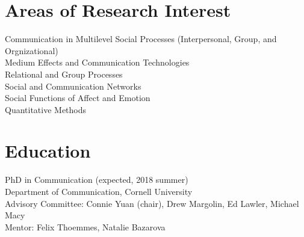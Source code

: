 \documentclass[11pt, letterpaper]{article} %
\newcommand{\years}[1]{\leavevmode\marginnote{\scriptsize #1}} %
\begin{document}

\section*{Areas of Research Interest}

Communication in Multilevel Social Processes (Interpersonal, Group, and Orgnizational)\\
Medium Effects and Communication Technologies\\
Relational and Group Processes\\  
Social and Communication Networks\\ 
Social Functions of Affect and Emotion\\ 
Quantitative Methods %





\section*{Education}

PhD in Communication (expected, 2018 summer) \\
    \textsf{
        Department of Communication, Cornell University\\
        Advisory Committee: Connie Yuan (chair), Drew Margolin, Ed Lawler, Michael Macy\\
        Mentor: Felix Thoemmes, Natalie Bazarova
            } 
\end{document}
